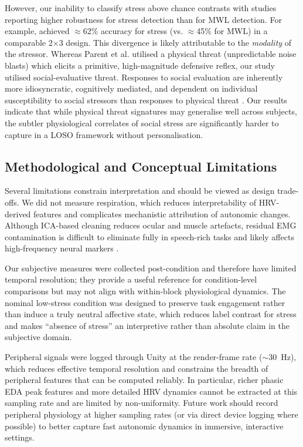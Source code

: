 \documentclass[lettersize,journal]{IEEEtran}
\begin{document}
However, our inability to classify stress above chance contrasts with studies reporting higher robustness for stress detection than for MWL detection. For example, \cite{parentDiagnosticityPsychophysiologicalSignatures2019} achieved $\approx$62\% accuracy for stress (vs. $\approx$45\% for MWL) in a comparable 2$\times$3 design. This divergence is likely attributable to the \textit{modality} of the stressor. Whereas Parent et al. utilised a physical threat (unpredictable noise blasts) which elicits a primitive, high-magnitude defensive reflex, our study utilised social-evaluative threat. Responses to social evaluation are inherently more idiosyncratic, cognitively mediated, and dependent on individual susceptibility to social stressors than responses to physical threat \cite{campbell-sillsPsychometricPropertiesSubjective2006}. Our results indicate that while physical threat signatures may generalise well across subjects, the subtler physiological correlates of social stress are significantly harder to capture in a LOSO framework without personalisation.

\subsection{Methodological and Conceptual Limitations}
Several limitations constrain interpretation and should be viewed as design trade-offs. We did not measure respiration, which reduces interpretability of HRV-derived features and complicates mechanistic attribution of autonomic changes. Although ICA-based cleaning reduces ocular and muscle artefacts, residual EMG contamination is difficult to eliminate fully in speech-rich tasks and likely affects high-frequency neural markers \cite{goncharovaEMGContaminationEEG2003}.

Our subjective measures were collected post-condition and therefore have limited temporal resolution; they provide a useful reference for condition-level comparisons but may not align with within-block physiological dynamics. The nominal low-stress condition was designed to preserve task engagement rather than induce a truly neutral affective state, which reduces label contrast for stress and makes ``absence of stress'' an interpretive rather than absolute claim in the subjective domain.

Peripheral signals were logged through Unity at the render-frame rate (\(\sim\)30~Hz), which reduces effective temporal resolution and constrains the breadth of peripheral features that can be computed reliably. In particular, richer phasic EDA peak features and more detailed HRV dynamics cannot be extracted at this sampling rate and are limited by non-uniformity. Future work should record peripheral physiology at higher sampling rates (or via direct device logging where possible) to better capture fast autonomic dynamics in immersive, interactive settings.
\end{document}
